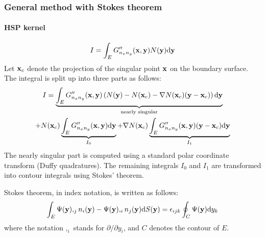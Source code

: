 \subsubsection{General method with Stokes theorem}

\paragraph{HSP kernel}

\begin{equation}
	I = \int_E G''_{n_x n_y}({\bf x}, {\bf y}) N({\bf y}) \mathrm{d} {\bf y}
\end{equation}
%
Let ${\bf x}_c$ denote the projection of the singular point ${\bf x}$ on the boundary surface.
The integral is split up into three parts as follows:
%
\begin{multline}
	I = \underbrace{\int_E G''_{n_x n_y}({\bf x}, {\bf y})
	\left( N({\bf y}) - N({\bf x}_c) - \nabla N({\bf x}_c) ({\bf y} - {\bf x}_c)\right)
	\mathrm{d} {\bf y}}_{\text{nearly singular}} \\
	+
	N({\bf x}_c)
	\underbrace{\int_E G''_{n_x n_y}({\bf x}, {\bf y})
	\mathrm{d} {\bf y}}_{I_0}
	+
	\nabla N({\bf x}_c)
	\underbrace{\int_E G''_{n_x n_y}({\bf x}, {\bf y})
	({\bf y} - {\bf x}_c)
	\mathrm{d} {\bf y}}_{I_1}
\end{multline}
%
The nearly singular part is computed using a standard polar coordinate transform (Duffy quadratures).
The remaining integrals $I_0$ and $I_1$ are transformed into contour integrals using Stokes' theorem.

Stokes theorem, in index notation, is written as follows:
%
\begin{equation}
	\int_E \Psi({\bf y}),_j n_i({\bf y}) - \Psi({\bf y}),_i n_j({\bf y}) \mathrm{d} S({\bf y}) = \epsilon_{ijk} \oint_C \Psi({\bf y}) \mathrm{d} y_k
\end{equation}
%
where the notation $,_i$ stands for $\partial/\partial y_i$, and $C$ denotes the contour of $E$.

